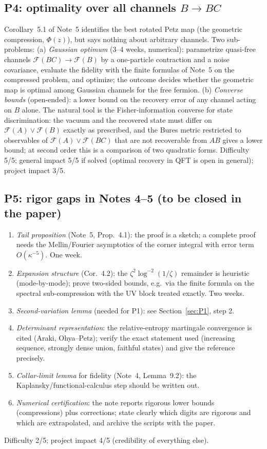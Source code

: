 \documentclass[11pt]{article}
\theoremstyle{accent}
\theoremstyle{definition}
\newcommand{\cF}{\mathcal{F}}
\begin{document}
\subsection{P4: optimality over all channels \(B\to BC\)}
Corollary~5.1 of Note~5 identifies the best rotated Petz map (the geometric compression, \(\Phi(z)\)), but says nothing about arbitrary channels.  Two sub-problems:
(a) \emph{Gaussian optimum} (3--4 weeks, numerical): parametrize quasi-free channels \(\cF(BC)\to\cF(B)\) by a one-particle contraction and a noise covariance, evaluate the fidelity with the finite formulas of Note~5 on the compressed problem, and optimize; the outcome decides whether the geometric map is optimal among Gaussian channels for the free fermion.
(b) \emph{Converse bounds} (open-ended): a lower bound on the recovery error of any channel acting on \(B\) alone.  The natural tool is the Fisher-information converse for state discrimination: the vacuum and the recovered state must differ on \(\cF(A)\vee\cF(B)\) exactly as prescribed, and the Bures metric restricted to observables of \(\cF(A)\vee\cF(BC)\) that are not recoverable from \(AB\) gives a lower bound; at second order this is a comparison of two quadratic forms.
Difficulty 5/5; general impact 5/5 if solved (optimal recovery in QFT is open in general); project impact 3/5.

\subsection{P5: rigor gaps in Notes 4--5 (to be closed in the paper)}
\begin{enumerate}
\item \emph{Tail proposition} (Note~5, Prop.~4.1): the proof is a sketch; a complete proof needs the Mellin/Fourier asymptotics of the corner integral with error term \(O(\kappa^{-5})\).  One week.
\item \emph{Expansion structure} (Cor.~4.2): the \(\zeta^2\log^{-2}(1/\zeta)\) remainder is heuristic (mode-by-mode); prove two-sided bounds, e.g.\ via the finite formula on the spectral sub-compression with the UV block treated exactly.  Two weeks.
\item \emph{Second-variation lemma} (needed for P1): see Section~\ref{sec:P1}, step 2.
\item \emph{Determinant representation}: the relative-entropy martingale convergence is cited (Araki, Ohya--Petz); verify the exact statement used (increasing sequence, strongly dense union, faithful states) and give the reference precisely.
\item \emph{Collar-limit lemma} for fidelity (Note~4, Lemma~9.2): the Kaplansky/functional-calculus step should be written out.
\item \emph{Numerical certification}: the note reports rigorous lower bounds (compressions) plus corrections; state clearly which digits are rigorous and which are extrapolated, and archive the scripts with the paper.
\end{enumerate}
Difficulty 2/5; project impact 4/5 (credibility of everything else).
\end{document}
